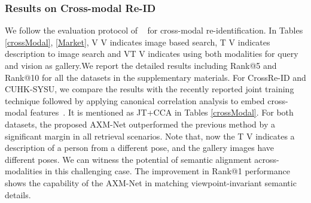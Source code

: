 \documentclass[10pt,twocolumn,letterpaper]{article}
\begin{document}
\begin{table}[!htbp]
\caption{\footnotesize{Design parameters for the visual contextual attention part branch}}
\label{part-design}
\end{table}



\subsubsection{Results on Cross-modal Re-ID}
We follow the evaluation protocol of ~\cite{farooq2020IJCB} for cross-modal re-identification. In Tables \ref{crossModal}, \ref{Market}, V  V indicates image based search, T  V indicates description to image search and VT  V indicates using both modalities for query and vision as gallery.We report the detailed results including Rank@5 and Rank@10 for all the datasets in the supplementary materials.
For CrossRe-ID and CUHK-SYSU, we compare the results with the recently reported joint training technique followed by applying canonical correlation analysis to embed cross-modal features~\cite{farooq2020IJCB}. It is mentioned as JT+CCA in Tables \ref{crossModal}. For both datasets, the proposed AXM-Net outperformed the previous method by a significant margin in all retrieval scenarios. Note that, now the  T  V indicates a description of a person from a different pose, and the gallery images have different poses. We can witness the potential of semantic alignment across-modalities in this challenging case. The improvement in Rank@1 performance shows the capability of the AXM-Net in matching viewpoint-invariant semantic details. 
\end{document}
